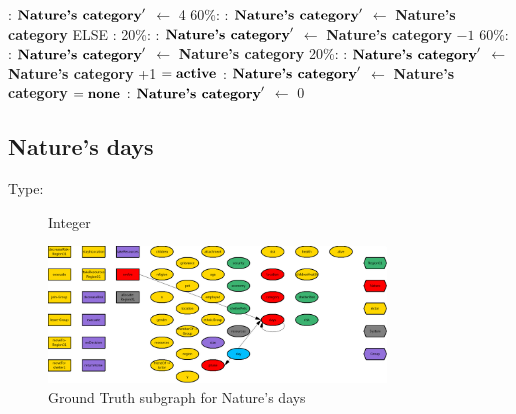 \documentclass{article}%
\begin{document}
\begin{flushleft}
: %
$\mbox{\textbf{Nature's category}} '$%
$\leftarrow$%
4%
\linebreak%
\hspace*{10em}%
60\%:%
: %
$\mbox{\textbf{Nature's category}} '$%
$\leftarrow$%
\textbf{Nature's category}%
\linebreak%
\hspace*{8em}%
ELSE %
: %
\linebreak%
\hspace*{10em}%
20\%:%
: %
$\mbox{\textbf{Nature's category}} '$%
$\leftarrow$%
\textbf{Nature's category}%
${-}1$%
\linebreak%
\hspace*{10em}%
60\%:%
: %
$\mbox{\textbf{Nature's category}} '$%
$\leftarrow$%
\textbf{Nature's category}%
\linebreak%
\hspace*{10em}%
20\%:%
: %
$\mbox{\textbf{Nature's category}} '$%
$\leftarrow$%
\textbf{Nature's category}%
+1%
\linebreak%
\hspace*{2em}%
$= \mbox{\textbf{active}}$%
: %
$\mbox{\textbf{Nature's category}} '$%
$\leftarrow$%
\textbf{Nature's category}%
\linebreak%
\hspace*{2em}%
$= \mbox{\textbf{none}}$%
: %
$\mbox{\textbf{Nature's category}} '$%
$\leftarrow$%
0%
\end{flushleft}

%
\subsection{Nature's days}%
\label{subsec:Nature's days}%
\begin{description}%
\item[Type:]%
Integer%
\end{description}%


\begin{figure}[ht]%
\centering%
\includegraphics[width=0.8\textwidth]{images/daysOfNature.png}%
\caption{Ground Truth subgraph for Nature's days}%
\end{figure}
\end{document}
